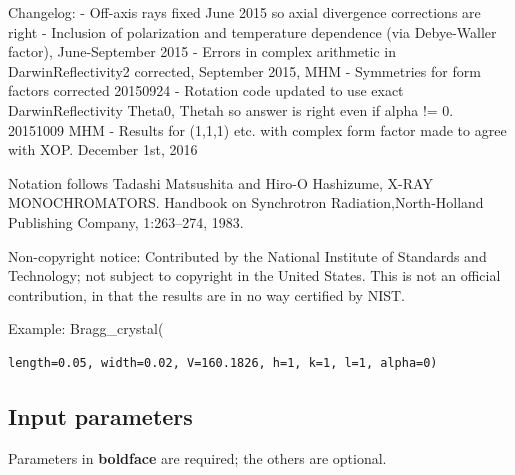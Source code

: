 Changelog: - Off-axis rays fixed June 2015 so axial divergence corrections are right - Inclusion of polarization and temperature dependence (via Debye-Waller factor), June-September 2015 - Errors in complex arithmetic in DarwinReflectivity2 corrected, September 2015, MHM - Symmetries for form factors corrected 20150924 - Rotation code updated to use exact DarwinReflectivity Theta0, Thetah so answer is right even if alpha != 0. 20151009 MHM - Results for (1,1,1) etc. with complex form factor made to agree with XOP. December 1st, 2016

Notation follows Tadashi Matsushita and Hiro-O Hashizume, X-RAY MONOCHROMATORS. Handbook on Synchrotron Radiation,North-Holland Publishing Company, 1:263–274, 1983.

Non-copyright notice: Contributed by the National Institute of Standards and Technology; not subject to copyright in the United States. This is not an official contribution, in that the results are in no way certified by NIST.

Example: Bragg\_crystal(

\begin{verbatim}
length=0.05, width=0.02, V=160.1826, h=1, k=1, l=1, alpha=0)
\end{verbatim}

\subsection*{Input parameters}
Parameters in \textbf{boldface} are required; the others are optional.

